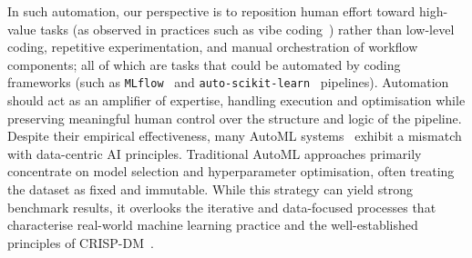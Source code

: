 \documentclass[runningheads]{llncs}
\begin{document}
In such automation,
our perspective is to reposition human effort toward high-value tasks
(as observed in practices such as vibe coding~\cite{welsh2022end})
rather than low-level coding,
repetitive experimentation,
and manual orchestration of workflow components;
all of which are tasks that could be automated by coding frameworks
(such as \texttt{MLflow}~\cite{zaharia2018accelerating} and \texttt{auto-scikit-learn}~\cite{DBLP:journals/jmlr/FeurerEFLH22} pipelines).
%
Automation should act as an amplifier of expertise,
handling execution and optimisation while preserving meaningful human control over the structure and logic of the pipeline.
%
Despite their empirical effectiveness, many \ac{AutoML} systems~\cite{zha2025data} exhibit a mismatch with data-centric \ac{AI} principles.
%
Traditional \ac{AutoML} approaches primarily concentrate on model selection and hyperparameter optimisation,
often treating the dataset as fixed and immutable.
%
While this strategy can yield strong benchmark results,
it overlooks the iterative and data-focused processes that characterise real-world machine learning practice and the well-established principles of CRISP-DM~\cite{schroer2021systematic}.


\end{document}
